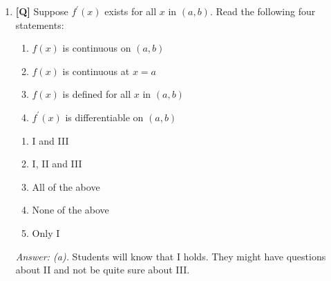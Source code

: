 \documentclass[12pt]{article}
\begin{document}
\begin{enumerate}
{\it Answer (b).} Once the students realize that $f^{\prime}(x)$ is the speed of the train after $x$ hours, most of them will give the right answer.

\bigskip

\item {\bf [Q]} Suppose $f^{\prime}(x)$ exists for all $x$ in $(a,b)$. Read the following four statements:

\renewcommand{\theenumii}{\Roman{enumii}}
\begin{enumerate}
\item $f(x)$ is continuous on $(a,b)$
\item $f(x)$ is continuous at $x=a$
\item $f(x)$ is defined for all $x$ in $(a,b)$
\item $f^{\prime}(x)$ is differentiable on $(a,b)$
\end{enumerate}
\renewcommand{\theenumii}{\alph{enumii}}
\begin{enumerate}
\item I and III
\item I, II and III
\item All of the above
\item None of the above
\item Only I
\end{enumerate}

{\it Answer: (a).} Students will know that I holds. They might have questions about II and not be quite sure about III. 

\end{enumerate}

\pagebreak
\end{document}
